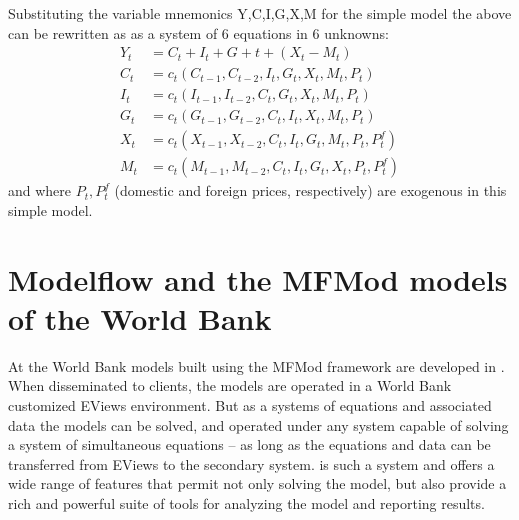 \documentclass[letterpaper,10pt,english]{jupyterBook}
\begin{document}
\sphinxAtStartPar
Substituting the variable mnemonics Y,C,I,G,X,M for the simple model the above can be rewritten as as a system of 6 equations in 6 unknowns:
\begin{align*}
Y_t  &=  C_t+I_t+G+t+ (X_t-M_t) \\
C_t &= c_t(C_{t-1},C_{t-2},I_t,G_t,X_t,M_t,P_t)\\
I_t &= c_t(I_{t-1},I_{t-2},C_t,G_t,X_t,M_t,P_t)\\
G_t &= c_t(G_{t-1},G_{t-2},C_t,I_t,X_t,M_t,P_t)\\
X_t &= c_t(X_{t-1},X_{t-2},C_t,I_t,G_t,M_t,P_t,P^f_t)\\
M_t &= c_t(M_{t-1},M_{t-2},C_t,I_t,G_t,X_t,P_t,P^f_t)
\end{align*}
\sphinxAtStartPar
and where \(P_t, P^f_t\) (domestic and foreign prices, respectively) are exogenous in this simple model.

\sphinxstepscope


\chapter{Modelflow and the MFMod models of the World Bank}
\label{\detokenize{content/02_MacrostructuralModels/MFModAndModelFlow:modelflow-and-the-mfmod-models-of-the-world-bank}}\label{\detokenize{content/02_MacrostructuralModels/MFModAndModelFlow::doc}}
\sphinxAtStartPar
At the World Bank models built using the MFMod framework are developed in . When disseminated to clients, the models are operated in a World Bank customized EViews environment. But as a systems of equations and associated data the models can be solved, and operated under any system capable of solving a system of simultaneous equations – as long as the equations and data can be transferred from EViews to the secondary system.  is such a system and offers a wide range of features that permit not only solving the model, but also provide a rich and powerful suite of tools for analyzing the model and reporting results.
\end{document}
